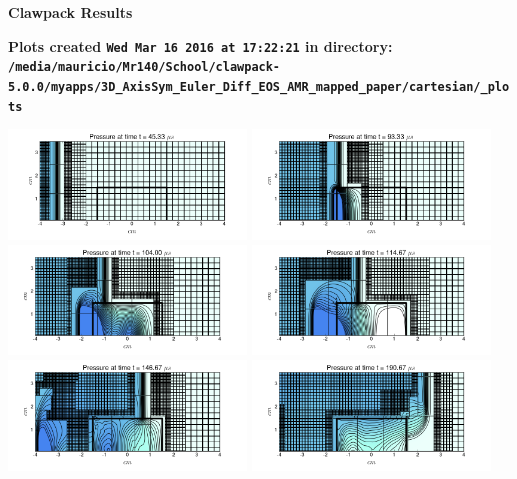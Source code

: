 \documentclass[11pt]{article}
\begin{document}
        \begin{center}{\Large\bf Clawpack Results}\vskip 5pt
        
        \bf Plots created {\tt Wed Mar 16 2016 at 17:22:21} in directory: \vskip 5pt
        \verb+/media/mauricio/Mr140/School/clawpack-5.0.0/myapps/3D_AxisSym_Euler_Diff_EOS_AMR_mapped_paper/cartesian/_plots+
        \end{center}
        \vskip 5pt
        \includegraphics[width=0.475\textwidth]{frame0034fig4.png}
\vskip 10pt 
\includegraphics[width=0.475\textwidth]{frame0070fig4.png}
\vskip 10pt 
\includegraphics[width=0.475\textwidth]{frame0078fig4.png}
\vskip 10pt 
\includegraphics[width=0.475\textwidth]{frame0086fig4.png}
\vskip 10pt 
\includegraphics[width=0.475\textwidth]{frame0110fig4.png}
\vskip 10pt 
\includegraphics[width=0.475\textwidth]{frame0143fig4.png}
\end{document}
